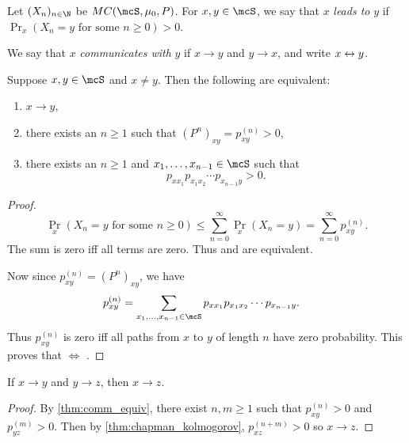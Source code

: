 \begin{definition}[Communication] \label{def:communication}
    Let $(X_n)_{n \in \N}$ be $MC(\mcS, \mu_0, P)$.
    For $x, y \in \mcS$, we say that $x$ \emph{leads to} $y$ if
    $\Pr_x(X_n = y \text{ for some } n \ge 0) > 0$.

    We say that $x$ \emph{communicates with} $y$ if $x \to y$ and $y \to x$,
    and write $x \leftrightarrow y$.
\end{definition}

\begin{theorem} \label{thm:comm_equiv}
    Suppose $x, y \in \mcS$ and $x \ne y$.
    Then the following are equivalent:
    \begin{enumerate}
        \item \label{thm:comm_equiv:def}
        $x \to y$,
        \item \label{thm:comm_equiv:sum}
        there exists an $n \ge 1$ such that $(P^n)_{xy} = p_{xy}^{(n)} > 0$,
        \item \label{thm:comm_equiv:path}
        there exists an $n \ge 1$ and $x_1, \dots, x_{n-1} \in \mcS$ such that
        \[
            p_{x x_1} p_{x_1 x_2} \cdots p_{x_{n-1} y} > 0.
        \]
    \end{enumerate}
\end{theorem}
\begin{proof}
    \[
        \Pr_x(X_n = y \text{ for some } n \ge 0)
            \le \sum_{n=0}^\infty \Pr_x(X_n = y)
            = \sum_{n=0}^\infty p_{xy}^{(n)}.
    \]
    The sum is zero iff all terms are zero.
    Thus  and 
    are equivalent.

    Now since $p_{xy}^{(n)} = (P^n)_{xy}$, we have \begin{align*}
        p_{xy}^{(n)}
            &= \sum_{x_1, \dots, x_{n-1} \in \mcS} p_{xx_1} p_{x_1 x_2}
                \cdots p_{x_{n-1} y}.
    \end{align*}
    Thus $p_{xy}^{(n)}$ is zero iff all paths from $x$ to $y$ of length $n$
    have zero probability.
    This proves that  $\iff$
    .
\end{proof}
\begin{corollary}
    If $x \to y$ and $y \to z$, then $x \to z$.
\end{corollary}
\begin{proof}
    By \cref{thm:comm_equiv}, there exist $n, m \ge 1$ such that
    $p_{xy}^{(n)} > 0$ and $p_{yz}^{(m)} > 0$.
    Then by \cref{thm:chapman_kolmogorov}, $p_{xz}^{(n+m)} > 0$
    so $x \to z$.
\end{proof}

